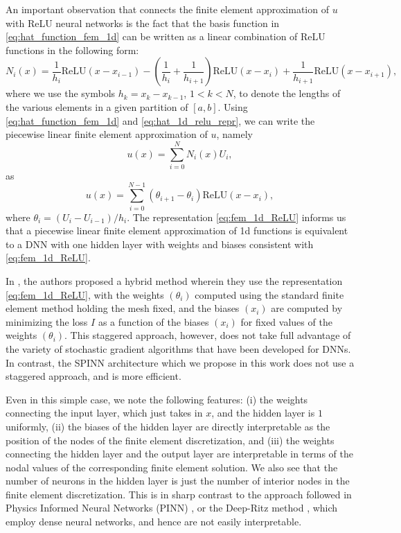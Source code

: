 \documentclass[12pt]{article}
\begin{document}
An important observation that connects the finite element approximation of $u$ with ReLU neural networks is the fact that the basis function in \eqref{eq:hat_function_fem_1d} can be written as a linear combination of ReLU functions in the following form:
\begin{equation} \label{eq:hat_1d_relu_repr}
N_i(x) = \frac{1}{h_i}\text{ReLU}(x - x_{i-1}) - \left(\frac{1}{h_i} + \frac{1}{h_{i+1}}\right)\text{ReLU}(x - x_i) + \frac{1}{h_{i+1}}\text{ReLU}(x - x_{i+1}),
\end{equation}
where we use the symbols $h_k = x_{k} - x_{k-1}$, $1 < k < N$, to denote the lengths of the various elements in a given partition of $[a,b]$. Using \eqref{eq:hat_function_fem_1d} and \eqref{eq:hat_1d_relu_repr}, we can write the piecewise linear finite element approximation of $u$, namely
\begin{equation} \label{eq:fem_approx_1d}
u(x) = \sum_{i=0}^N N_i(x) U_i,
\end{equation}
as
\begin{equation} \label{eq:fem_1d_ReLU}
u(x) = \sum_{i=0}^{N - 1} (\theta_{i+1} - \theta_i) \text{ReLU}(x - x_i),
\end{equation}
where $\theta_i = (U_i - U_{i-1})/h_i$. The representation \eqref{eq:fem_1d_ReLU} informs us that a piecewise linear finite element approximation of 1d functions is equivalent to a DNN with one hidden layer with weights and biases consistent with \eqref{eq:fem_1d_ReLU}.

In \cite{HLXZ2020}, the authors proposed a hybrid method wherein they use the representation \eqref{eq:fem_1d_ReLU}, with the weights $(\theta_i)$ computed using the standard finite element method holding the mesh fixed, and the biases $(x_i)$ are computed by minimizing the loss $I$ as a function of the biases $(x_i)$ for fixed values of the weights $(\theta_i)$. This staggered approach, however, does not take full advantage of the variety of stochastic gradient algorithms that have been developed for DNNs. In contrast, the SPINN architecture which we propose in this work does not use a staggered approach, and is more efficient.

Even in this simple case, we note the following features: (i) the weights connecting the input layer, which just takes in $x$, and the hidden layer is $1$ uniformly, (ii) the biases of the hidden layer are directly interpretable as the position of the nodes of the finite element discretization, and (iii) the weights connecting the hidden layer and the output layer are interpretable in terms of the nodal values of the corresponding finite element solution. We also see that the number of neurons in the hidden layer is just the number of interior nodes in the finite element discretization. This is in sharp contrast to the approach followed in Physics Informed Neural Networks (PINN) \cite{RPK2019}, or the Deep-Ritz method \cite{EYu2018}, which employ dense neural networks, and hence are not easily interpretable.
\end{document}
